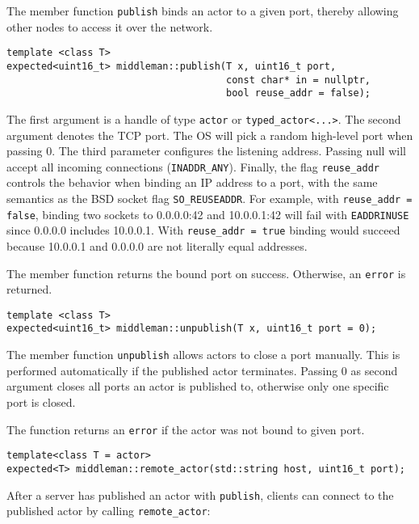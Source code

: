 The member function \lstinline^publish^ binds an actor to a given port, thereby
allowing other nodes to access it over the network.

\begin{lstlisting}
template <class T>
expected<uint16_t> middleman::publish(T x, uint16_t port,
                                      const char* in = nullptr,
                                      bool reuse_addr = false);
\end{lstlisting}

The first argument is a handle of type \lstinline^actor^ or
\lstinline^typed_actor<...>^. The second argument denotes the TCP port. The OS
will pick a random high-level port when passing 0. The third parameter
configures the listening address. Passing null will accept all incoming
connections (\lstinline^INADDR_ANY^). Finally, the flag \lstinline^reuse_addr^
controls the behavior when binding an IP address to a port, with the same
semantics as the BSD socket flag \lstinline^SO_REUSEADDR^. For example, with
\lstinline^reuse_addr = false^, binding two sockets to 0.0.0.0:42 and
10.0.0.1:42 will fail with \texttt{EADDRINUSE} since 0.0.0.0 includes 10.0.0.1.
With \lstinline^reuse_addr = true^ binding would succeed because 10.0.0.1 and
0.0.0.0 are not literally equal addresses.

The member function returns the bound port on success. Otherwise, an
\lstinline^error^  is returned.

\begin{lstlisting}
template <class T>
expected<uint16_t> middleman::unpublish(T x, uint16_t port = 0);
\end{lstlisting}

The member function \lstinline^unpublish^ allows actors to close a port
manually. This is performed automatically if the published actor terminates.
Passing 0 as second argument closes all ports an actor is published to,
otherwise only one specific port is closed.

The function returns an \lstinline^error^  if the actor was not
bound to given port.

\clearpage
\begin{lstlisting}
template<class T = actor>
expected<T> middleman::remote_actor(std::string host, uint16_t port);
\end{lstlisting}

After a server has published an actor with \lstinline^publish^, clients can
connect to the published actor by calling \lstinline^remote_actor^:

